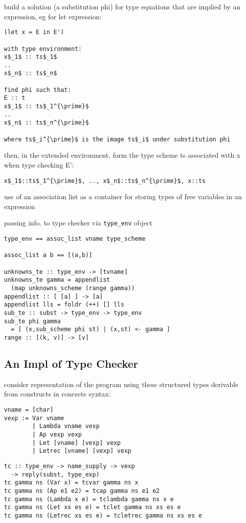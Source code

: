 \documentclass[8pt]{extarticle}
\begin{document}
\begin{multicols*}{2}
build a solution (a substitution phi) for type equations that are implied by an expression, eg for let expression:
\begin{lstlisting}
(let x = E in E')

with type environment:
x$_1$ :: ts$_1$
..
x$_n$ :: ts$_n$

find phi such that:
E :: t
x$_1$ :: ts$_1^{\prime}$
..
x$_n$ :: ts$_n^{\prime}$

where ts$_i^{\prime}$ is the image ts$_i$ under substitution phi
\end{lstlisting}

then, in the extended environment, form the type scheme ts associated with x when type checking E':
\begin{lstlisting}
x$_1$::ts$_1^{\prime}$, .., x$_n$::ts$_n^{\prime}$, x::ts
\end{lstlisting}

use of an association list as a container for storing types of free variables in an expression

passing info. to type checker via \verb|type_env| object

\begin{verbatim}
type_env == assoc_list vname type_scheme

assoc_list a b == [(a,b)]

unknowns_te :: type_env -> [tvname]
unknowns_te gamma = appendlist
  (map unknowns_scheme (range gamma))
appendlist :: [ [a] ] -> [a]
appendlist lls = foldr (++) [] lls
sub_te :: subst -> type_env -> type_env
sub_te phi gamma
  = [ (x,sub_scheme phi st) | (x,st) <- gamma ]
range :: [(k, v)] -> [v]
\end{verbatim}

\vfill\null
\pagebreak

\subsection{An Impl of Type Checker}

consider representation of the program using these structured types derivable from constructs in concrete syntax:
\begin{verbatim}
vname = [char]
vexp := Var vname
        | Lambda vname vexp
        | Ap vexp vexp
        | Let [vname] [vexp] vexp
        | Letrec [vname] [vexp] vexp
\end{verbatim}

\begin{verbatim}
tc :: type_env -> name_supply -> vexp
  -> reply(subst, type_exp)
tc gamma ns (Var x) = tcvar gamma ns x
tc gamma ns (Ap e1 e2) = tcap gamma ns e1 e2
tc gamma ns (Lambda x e) = tclambda gamma ns x e
tc gamma ns (Let xs es e) = tclet gamma ns xs es e
tc gamma ns (Letrec xs es e) = tcletrec gamma ns xs es e
\end{verbatim}


\end{multicols*}
\end{document}

